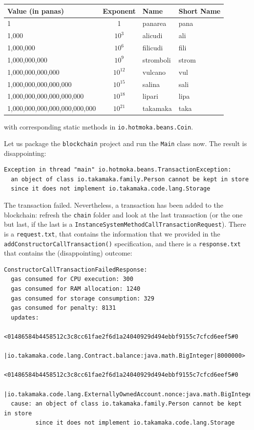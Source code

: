 \documentclass[a4paper,]{book}
\begin{document}
{\begin{longtable}[]{@{}lcll@{}}
\toprule
Value (in panas) & Exponent & Name & Short Name\tabularnewline
\midrule
\endhead
1 & 1 & panarea & pana\tabularnewline
1,000 & $10^3$ & alicudi & ali\tabularnewline
1,000,000 & $10^6$ & filicudi & fili\tabularnewline
1,000,000,000 & $10^9$ & stromboli & strom\tabularnewline
1,000,000,000,000 & $10^{12}$ & vulcano & vul\tabularnewline
1,000,000,000,000,000 & $10^{15}$ & salina & sali\tabularnewline
1,000,000,000,000,000,000 & $10^{18}$ & lipari & lipa\tabularnewline
1,000,000,000,000,000,000,000 & $10^{21}$ & takamaka & taka\tabularnewline
\bottomrule
\end{longtable}

with corresponding static methods in \texttt{io.hotmoka.beans.Coin}.

Let us package the \texttt{blockchain} project and run the \texttt{Main}
class now. The result is disappointing:

\begin{myverbatim}
\begin{verbatim}
Exception in thread "main" io.hotmoka.beans.TransactionException:
  an object of class io.takamaka.family.Person cannot be kept in store
  since it does not implement io.takamaka.code.lang.Storage
\end{verbatim}
\end{myverbatim}

The transaction failed. Nevertheless, a transaction has been added to
the blockchain: refresh the \texttt{chain} folder and look at the last
transaction (or the one but last, if the last is a
\texttt{InstanceSystemMethodCallTransactionRequest}). There is a
\texttt{request.txt}, that contains the information that we provided in
the \texttt{addConstructorCallTransaction()} specification, and there is
a \texttt{response.txt} that contains the (disappointing) outcome:

\begin{myverbatim}
\begin{verbatim}
ConstructorCallTransactionFailedResponse:
  gas consumed for CPU execution: 300
  gas consumed for RAM allocation: 1240
  gas consumed for storage consumption: 329
  gas consumed for penalty: 8131
  updates:
    <01486584b4458512c3c8cc61fae2f6d1a24040929d494ebbf9155c7cfcd6eef5#0
      |io.takamaka.code.lang.Contract.balance:java.math.BigInteger|8000000>
    <01486584b4458512c3c8cc61fae2f6d1a24040929d494ebbf9155c7cfcd6eef5#0
      |io.takamaka.code.lang.ExternallyOwnedAccount.nonce:java.math.BigInteger|1>
  cause: an object of class io.takamaka.family.Person cannot be kept in store
         since it does not implement io.takamaka.code.lang.Storage
\end{verbatim}
\end{myverbatim}

}
\end{document}

